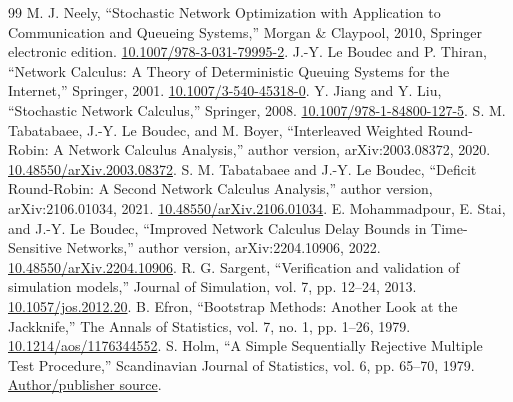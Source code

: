 \documentclass[10pt,a4paper]{article}
\begin{document}
\begin{thebibliography}{99}
 M. J. Neely, ``Stochastic Network Optimization with Application to Communication and Queueing Systems,'' Morgan \& Claypool, 2010, Springer electronic edition. \href{https://doi.org/10.1007/978-3-031-79995-2}{10.1007/978-3-031-79995-2}.
 J.-Y. Le Boudec and P. Thiran, ``Network Calculus: A Theory of Deterministic Queuing Systems for the Internet,'' Springer, 2001. \href{https://doi.org/10.1007/3-540-45318-0}{10.1007/3-540-45318-0}.
 Y. Jiang and Y. Liu, ``Stochastic Network Calculus,'' Springer, 2008. \href{https://doi.org/10.1007/978-1-84800-127-5}{10.1007/978-1-84800-127-5}.
 S. M. Tabatabaee, J.-Y. Le Boudec, and M. Boyer, ``Interleaved Weighted Round-Robin: A Network Calculus Analysis,'' author version, arXiv:2003.08372, 2020. \href{https://doi.org/10.48550/arXiv.2003.08372}{10.48550/arXiv.2003.08372}.
 S. M. Tabatabaee and J.-Y. Le Boudec, ``Deficit Round-Robin: A Second Network Calculus Analysis,'' author version, arXiv:2106.01034, 2021. \href{https://doi.org/10.48550/arXiv.2106.01034}{10.48550/arXiv.2106.01034}.
 E. Mohammadpour, E. Stai, and J.-Y. Le Boudec, ``Improved Network Calculus Delay Bounds in Time-Sensitive Networks,'' author version, arXiv:2204.10906, 2022. \href{https://doi.org/10.48550/arXiv.2204.10906}{10.48550/arXiv.2204.10906}.
 R. G. Sargent, ``Verification and validation of simulation models,'' Journal of Simulation, vol. 7, pp. 12--24, 2013. \href{https://doi.org/10.1057/jos.2012.20}{10.1057/jos.2012.20}.
 B. Efron, ``Bootstrap Methods: Another Look at the Jackknife,'' The Annals of Statistics, vol. 7, no. 1, pp. 1--26, 1979. \href{https://doi.org/10.1214/aos/1176344552}{10.1214/aos/1176344552}.
 S. Holm, ``A Simple Sequentially Rejective Multiple Test Procedure,'' Scandinavian Journal of Statistics, vol. 6, pp. 65--70, 1979. \href{https://www.jstor.org/stable/4615733}{Author/publisher source}.
\end{thebibliography}
\end{document}
